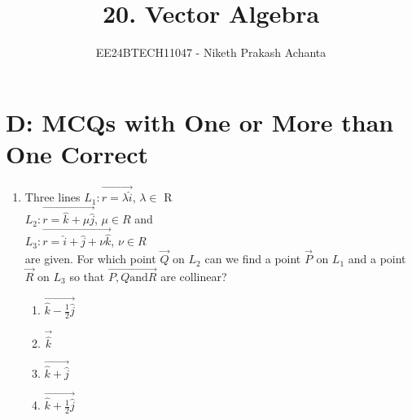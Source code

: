 \documentclass[journal,12pt,twocolumn]{IEEEtran}
\theoremstyle{remark}
\begin{document}

\vspace{3cm}

\title{20. Vector Algebra}
\author{EE24BTECH11047 - Niketh Prakash Achanta}
\maketitle
\newpage
\bigskip

\renewcommand{\thefigure}{\theenumi}
\renewcommand{\thetable}{\theenumi}
\section{D: MCQs with One or More than One Correct}
\begin{enumerate}
\item %
	Three lines $L_1:\vec{r=\lambda\hat{i}}$, $\lambda\in$ R\\
		$L_2:\vec{r=\hat{k}+\mu\hat{j}}$, $\mu\in R$ and\\
		$L_3:\vec{r=\hat{i}+\hat{j}+\nu\hat{k}}$, $\nu\in R$\\
		are given. For which point $\vec{Q}$ on $L_2$ can we find a point $\vec{P}$ on $L_1$ and a point $\vec{R}$ on $L_3$ so that $\vec{P,Q \text{and} R}$ are collinear? \hfill{}\\
  \begin{enumerate}
	  \item $\vec{\hat{k}-\frac{1}{2}\hat{j}}$
	  \item $\vec{\hat{k}}$
	  \item $\vec{\hat{k}+\hat{j}}$
	  \item $\vec{\hat{k}+\frac{1}{2}\hat{j}}$
   \end{enumerate}
\end{enumerate}	
\end{document}
